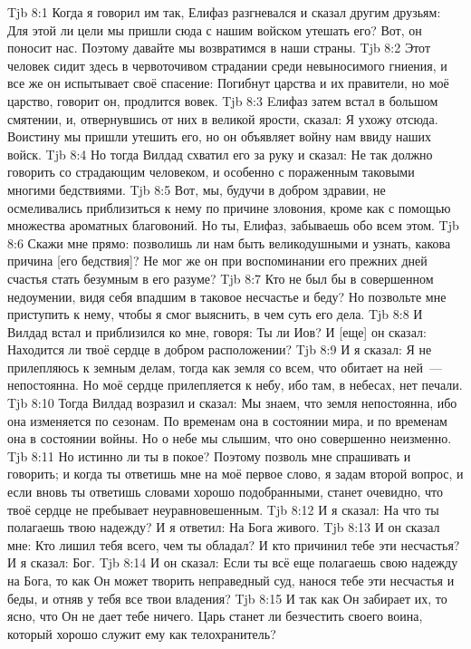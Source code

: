 \vs Tjb 8:1
Когда я говорил им так, Елифаз разгневался и сказал другим друзьям: Для этой ли цели мы пришли сюда с нашим войском утешать его? Вот, он поносит нас. Поэтому давайте мы возвратимся в наши страны.
\vs Tjb 8:2
Этот человек сидит здесь в червоточивом страдании среди невыносимого гниения, и все же он испытывает своё спасение: Погибнут царства и их правители, но моё царство, говорит он, продлится вовек.
\vs Tjb 8:3
Eлифаз затем встал в большом смятении, и, отвернувшись от них в великой ярости, сказал: Я ухожу отсюда. Воистину мы пришли утешить его, но он объявляет войну нам ввиду наших войск.
\vs Tjb 8:4
Но тогда Вилдад схватил его за руку и сказал: Не так должно говорить со страдающим человеком, и особенно с пораженным таковыми многими бедствиями.
\vs Tjb 8:5
Вот, мы, будучи в добром здравии, не осмеливались приблизиться к нему по причине зловония, кроме как с помощью множества ароматных благовоний. Но ты, Елифаз, забываешь обо всем этом.
\vs Tjb 8:6
Скажи мне прямо: позволишь ли нам быть великодушными и узнать, какова причина [его бедствия]? Не мог же он при воспоминании его прежних дней счастья стать безумным в его разуме?
\vs Tjb 8:7
Кто не был бы в совершенном недоумении, видя себя впадшим в таковое несчастье и беду? Но позвольте мне приступить к нему, чтобы я смог выяснить, в чем суть его дела.
\vs Tjb 8:8
И Вилдад встал и приблизился ко мне, говоря: Ты ли Иов? И [еще] он сказал: Находится ли твоё сердце в добром расположении?
\vs Tjb 8:9
И я сказал: Я не прилепляюсь к земным делам, тогда как земля со всем, что обитает на ней~--- непостоянна. Но моё сердце прилепляется к небу, ибо там, в небесах, нет печали.
\vs Tjb 8:10
Тогда Вилдад возразил и сказал: Мы знаем, что земля непостоянна, ибо она изменяется по сезонам. По временам она в состоянии мира, и по временам она в состоянии войны. Но о небе мы слышим, что оно совершенно неизменно.
\vs Tjb 8:11
Но истинно ли ты в покое? Поэтому позволь мне спрашивать и говорить; и когда ты ответишь мне на моё первое слово, я задам второй вопрос, и если вновь ты ответишь словами хорошо подобранными, станет очевидно, что твоё сердце не пребывает неуравновешенным.
\vs Tjb 8:12
И я сказал: На что ты полагаешь твою надежду? И я ответил: На Бога живого.
\vs Tjb 8:13
И он сказал мне: Кто лишил тебя всего, чем ты обладал? И кто причинил тебе эти несчастья? И я сказал: Бог.
\vs Tjb 8:14
И он сказал: Если ты всё еще полагаешь свою надежду на Бога, то как Он может творить неправедный суд, нанося тебе эти несчастья и беды, и отняв у тебя все твои владения?
\vs Tjb 8:15
И так как Он забирает их, то ясно, что Он не дает тебе ничего. Царь станет ли безчестить своего воина, который хорошо служит ему как телохранитель?
